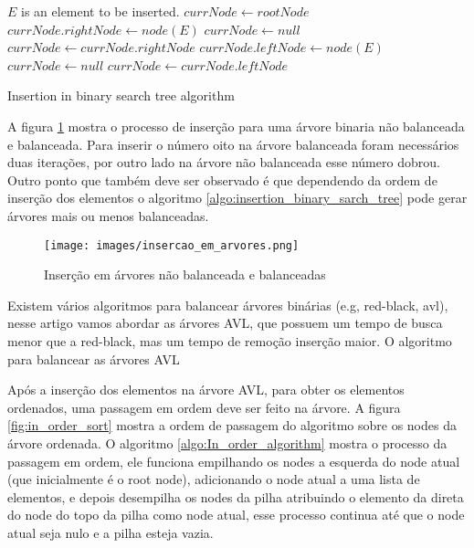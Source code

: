 \documentclass[12pt]{article}
\begin{document}
\begin{algorithm}[H]
\begin{algorithmic}

\STATE $E$ is an element to be inserted.
\STATE $currNode \gets rootNode$
            \STATE $currNode.rightNode \gets node(E)$
            \STATE $currNode \gets null$
        \ELSE
            \STATE $currNode \gets currNode.rightNode$
        \ENDIF
    \ELSE
            \STATE $currNode.leftNode \gets node(E)$
            \STATE $currNode \gets null$
        \ELSE
            \STATE $currNode \gets currNode.leftNode$
        \ENDIF
    \ENDIF
\ENDWHILE

\end{algorithmic}
\caption{Insertion in binary search tree algorithm}
\label{algo:insertion_binary_sarch_tree}
\end{algorithm}

A figura \ref{fig:insercao_em_arvores} mostra o processo de inserção para uma árvore binaria não balanceada e balanceada. Para inserir o número oito na árvore balanceada foram necessários duas iterações, por outro lado na árvore não balanceada esse número dobrou. Outro ponto que também deve ser observado é que dependendo da ordem de inserção dos elementos o algoritmo \ref{algo:insertion_binary_sarch_tree} pode gerar árvores mais ou menos balanceadas. 

\begin{figure}[ht]
\centering
\texttt{[image: images/insercao\_em\_arvores.png]}
\caption{Inserção em árvores não balanceada e balanceadas}
\label{fig:insercao_em_arvores}
\end{figure}

Existem vários algoritmos para balancear árvores binárias (e.g, red-black, avl), nesse artigo vamos abordar as árvores AVL, que possuem um tempo de busca menor que a red-black, mas um tempo de remoção inserção maior. O algoritmo para balancear as árvores AVL 

Após a inserção dos elementos na árvore AVL, para obter os elementos ordenados, uma passagem em ordem deve ser feito na árvore. A figura \ref{fig:in_order_sort} mostra a ordem de passagem do algoritmo sobre os nodes da árvore ordenada. O algoritmo \ref{algo:In_order_algorithm} mostra o processo da passagem em ordem, ele funciona empilhando os nodes a esquerda do node atual (que inicialmente é o root node), adicionando o node atual a uma lista de elementos, e depois desempilha os nodes da pilha atribuindo o elemento da direta do node do topo da pilha como node atual, esse processo continua até que o node atual seja nulo e a pilha esteja vazia.
\end{document}
